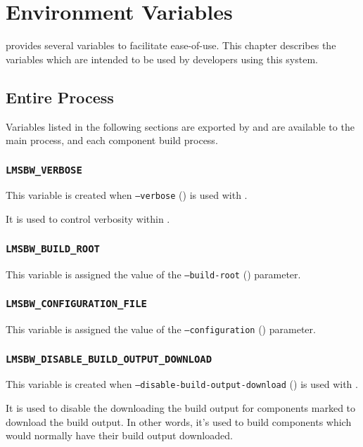 \chapter{Environment Variables}

\lmsbw provides several variables to facilitate ease-of-use.  This
chapter describes the variables which are intended to be used by
developers using this system.

\section{Entire \lmsbw Process}

Variables listed in the following sections are exported by \lmsbwcmd
and are available to the main \lmsbw process, and each component build
process.

\subsection{\texttt{LMSBW\_VERBOSE}}

This variable is created when \texttt{--verbose}
() is used with \lmsbwcmd.

It is used to control verbosity within \lmsbw.

\subsection{\texttt{LMSBW\_BUILD\_ROOT}}

This variable is assigned the value of the \texttt{--build-root}
() parameter.

\subsection{\texttt{LMSBW\_CONFIGURATION\_FILE}}

This variable is assigned the value of the \texttt{--configuration}
() parameter.

\subsection{\texttt{LMSBW\_DISABLE\_BUILD\_OUTPUT\_DOWNLOAD}}

This variable is created when \texttt{--disable-build-output-download}
() is used with
\lmsbwcmd.

It is used to disable the downloading the build output for components
marked to download the build output.  In other words, it's used to
build components which would normally have their build output
downloaded.


